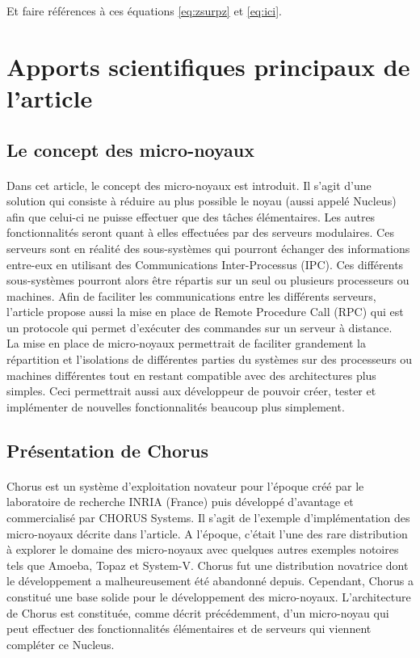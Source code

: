 \documentclass[a4paper, 12pt]{article}
\begin{document}
Et faire références à ces équations \eqref{eq:zsurpz} et \eqref{eq:ici}.

\clearpage 
\section{Apports scientifiques principaux de l’article}
\subsection{Le concept des micro-noyaux}
\paragraph{}

Dans cet article, le concept des micro-noyaux est introduit. Il s'agit d'une solution qui consiste à réduire au plus possible le noyau (aussi appelé Nucleus) afin que celui-ci ne puisse effectuer que des tâches élémentaires. Les autres fonctionnalités seront quant à elles effectuées par des serveurs modulaires. Ces serveurs sont en réalité des sous-systèmes qui pourront échanger des informations entre-eux en utilisant des Communications Inter-Processus (IPC). Ces différents sous-systèmes pourront alors être répartis sur un seul ou plusieurs processeurs ou machines. Afin de faciliter les communications entre les différents serveurs, l'article propose aussi la mise en place de Remote Procedure Call (RPC) qui est un protocole qui permet d'exécuter des commandes sur un serveur à distance. \\
La mise en place de micro-noyaux permettrait de faciliter grandement la répartition et l'isolations de différentes parties du systèmes sur des processeurs ou machines différentes tout en restant compatible avec des architectures plus simples. Ceci permettrait aussi aux développeur de pouvoir créer, tester et implémenter de nouvelles fonctionnalités beaucoup plus simplement.

\subsection{Présentation de Chorus}
\paragraph{}
Chorus est un système d'exploitation novateur pour l'époque créé par le laboratoire de recherche INRIA (France) puis développé d'avantage et commercialisé par CHORUS Systems. Il s'agit de l'exemple d'implémentation des micro-noyaux décrite dans l'article. A l'époque, c'était l'une des rare distribution à explorer le domaine des micro-noyaux avec quelques autres exemples notoires tels que Amoeba, Topaz et System-V. Chorus fut une distribution novatrice dont le développement a malheureusement été abandonné depuis. Cependant, Chorus a constitué une base solide pour le développement des micro-noyaux. L'architecture de Chorus est constituée, comme décrit précédemment, d'un micro-noyau qui peut effectuer des fonctionnalités élémentaires et de serveurs qui viennent compléter ce Nucleus.
\\
\end{document}
